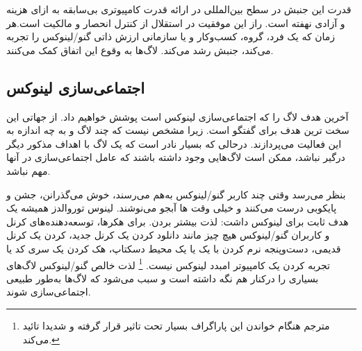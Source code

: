 
قدرت این جنبش در سطح بین‌المللی در ارائه قدرت کامپیوتری بی‌سابقه
به ازای هزینه و آزادی نهفته است. راز این موفقیت در استقلال
از کنترل انحصار و مالکیت است.هر زمان که یک فرد، گروه، کسب‌وکار
و یا سازمانی ارزش ذاتی گنو/لینوکس را تجربه می‌کند،  جنبش رشد می‌کند.
لاگ‌ها به وقوع این اتفاق کمک می‌کنند.

\subsection{اجتماعی‌سازی لینوکس}

آخرین هدف لاگ را که اجتماعی‌سازی لینوکس است پوشش خواهیم داد.
از جهاتی این سخت ترین هدف برای گفتگو است. زیرا مشخص نیست که
چند لاگ و به چه اندازه به این فعالیت می‌پردازند.
درحالی که بسیار نادر است که یک لاگ با اهداف مذکور دیگر درگیر نباشد،
ممکن است لاگ‌هایی وجود داشته باشند که عامل اجتماعی‌سازی در آنها مهم نباشد.

بنظر می‌رسد وقتی چند کاربر گنو/لینوکس به‌هم می‌رسند، خوش می‌گذرانن، جشن و پایکوبی
درست می‌کنند و خیلی وقت ها آبجو می‌نوشند. لینوس توروالدز همیشه یک هدف ثابت برای
لینوکس داشت: لذت بیشتر بردن.
برای هکرها، توسعه‌دهنده‌های کرنل و کاربران گنو/لینوکس هیچ چیز مانند دانلود کردن
یک کرنل جدید،
کردن یک کرنل قدیمی، دست‌وپنجه نرم کردن با یک
یا یک محیط دسکتاپ، هک کردن یک سری کد یا تجربه کردن یک کامپیوتر امبدد لینوکس نیست.
\footnote{مترجم هنگام خواندن این پاراگراف بسیار تحت تاثیر قرار گرفته و شدیدا تائید می‌کند.}
لذت خالص گنو/لینوکس لاگ‌های بسیاری را درکنار هم نگه داشته است و سبب می‌شود که لاگ‌ها
به‌طور طبیعی اجتماعی‌سازی شوند.

